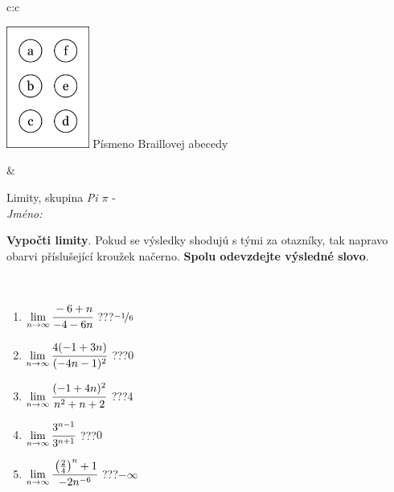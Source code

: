 \documentclass[10pt]{report}
\begin{document}
\begin{tabular}{c:c}
\begin{minipage}[c][104.5mm][t]{0.5\linewidth}
\begin{center}
\begin{minipage}{0.20\linewidth}
\begin{center}
\includegraphics[height=40mm]{../images/braille.png}
{\small Písmeno Braillovej abecedy}
\end{center}
\end{minipage}
\end{center}
\end{minipage}
&
\begin{minipage}[c][104.5mm][t]{0.5\linewidth}
\begin{center}
\vspace{7mm}
{\huge Limity, skupina \textit{Pi $\pi$} -}\\[5mm]
\textit{Jméno:}\phantom{xxxxxxxxxxxxxxxxxxxxxxxxxxxxxxxxxxxxxxxxxxxxxxxxxxxxxxxxxxxxxxxxx}\\[5mm]
\begin{minipage}{0.95\linewidth}
\begin{center}
\textbf{Vypočti limity}. Pokud se výsledky shodujú s tými za otazníky, tak napravo\\obarvi příslušející kroužek načerno. \textbf{Spolu odevzdejte výsledné slovo}.
\end{center}
\end{minipage}
\\[1mm]
\begin{minipage}{0.79\linewidth}
\begin{center}
\begin{varwidth}{\linewidth}
\begin{enumerate}
\normalsize
\item $\lim\limits_{n\to\infty}\cfrac{-6+n}{-4-6n}$\quad \dotfill\; ???\;\dotfill \quad $\nicefrac{-1}{6}$
\item $\lim\limits_{n\to\infty}\cfrac{4(-1+3n)}{(-4n-1)^2}$\quad \dotfill\; ???\;\dotfill \quad $0$
\item $\lim\limits_{n\to\infty}\cfrac{(-1+4n)^2}{n^2+n+2}$\quad \dotfill\; ???\;\dotfill \quad $4$
\item $\lim\limits_{n\to\infty}\cfrac{3^{n-1}}{3^{n+1}}$\quad \dotfill\; ???\;\dotfill \quad $0$
\item $\lim\limits_{n\to\infty}\cfrac{\left(\frac{2}{4}\right)^n +1}{-2n^{-6}}$\quad \dotfill\; ???\;\dotfill \quad $-\infty$

\end{enumerate}
\end{varwidth}
\end{center}
\end{minipage}
\end{center}
\end{minipage}
\end{tabular}
\end{document}
